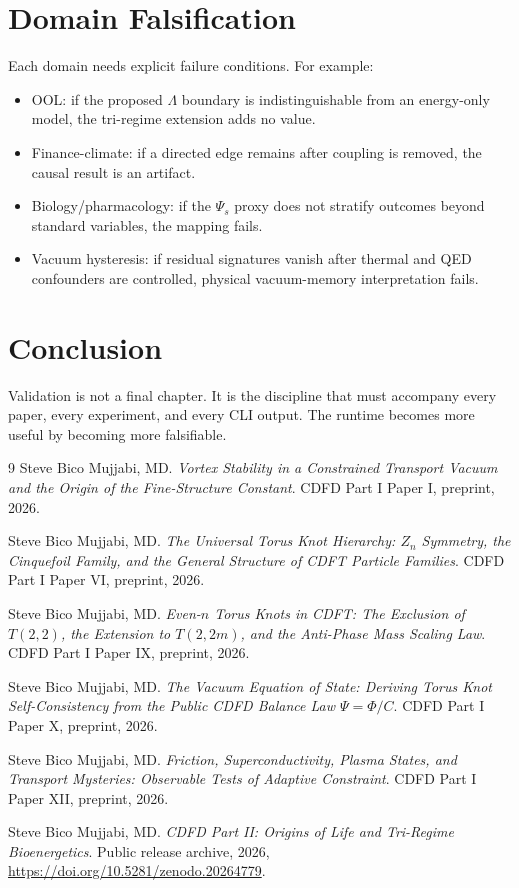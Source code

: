 \documentclass[12pt,a4paper]{article}
\begin{document}
\section{Domain Falsification}
Each domain needs explicit failure conditions. For example:
\begin{itemize}
    \item OOL: if the proposed $\Lambda$ boundary is indistinguishable from an
    energy-only model, the tri-regime extension adds no value.
    \item Finance-climate: if a directed edge remains after coupling is removed,
    the causal result is an artifact.
    \item Biology/pharmacology: if the $\Psi_s$ proxy does not stratify outcomes
    beyond standard variables, the mapping fails.
    \item Vacuum hysteresis: if residual signatures vanish after thermal and QED
    confounders are controlled, physical vacuum-memory interpretation fails.
\end{itemize}

\section{Conclusion}
Validation is not a final chapter. It is the discipline that must accompany
every paper, every experiment, and every CLI output. The runtime becomes
more useful by becoming more falsifiable.
\begin{thebibliography}{9}
Steve Bico Mujjabi, MD. \emph{Vortex Stability in a Constrained Transport Vacuum and the Origin of the Fine-Structure Constant}. CDFD Part I Paper I, preprint, 2026.

Steve Bico Mujjabi, MD. \emph{The Universal Torus Knot Hierarchy: $Z_n$ Symmetry, the Cinquefoil Family, and the General Structure of CDFT Particle Families}. CDFD Part I Paper VI, preprint, 2026.

Steve Bico Mujjabi, MD. \emph{Even-$n$ Torus Knots in CDFT: The Exclusion of $T(2,2)$, the Extension to $T(2,2m)$, and the Anti-Phase Mass Scaling Law}. CDFD Part I Paper IX, preprint, 2026.

Steve Bico Mujjabi, MD. \emph{The Vacuum Equation of State: Deriving Torus Knot Self-Consistency from the Public CDFD Balance Law $\Psi = \Phi/C$}. CDFD Part I Paper X, preprint, 2026.

Steve Bico Mujjabi, MD. \emph{Friction, Superconductivity, Plasma States, and Transport Mysteries: Observable Tests of Adaptive Constraint}. CDFD Part I Paper XII, preprint, 2026.

Steve Bico Mujjabi, MD. \emph{CDFD Part II: Origins of Life and Tri-Regime Bioenergetics}. Public release archive, 2026, \url{https://doi.org/10.5281/zenodo.20264779}.
\end{thebibliography}
\end{document}
